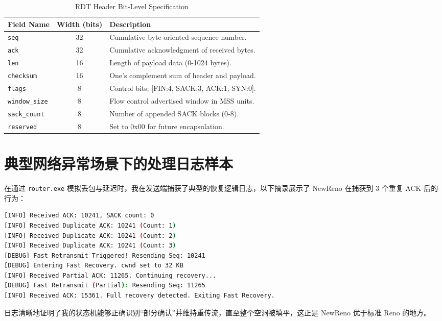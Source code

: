 \documentclass[UTF8,a4paper,10pt]{ctexart}
\begin{document}
\begin{table}[H]
    \centering
    \caption{RDT Header Bit-Level Specification}
    \label{tab:protocol_bits}
    \begin{tabular}{l|c|l}
        \toprule
        \textbf{Field Name}   & \textbf{Width (bits)} & \textbf{Description}                         \\
        \midrule
        \texttt{seq}          & 32                    & Cumulative byte-oriented sequence number.    \\
        \texttt{ack}          & 32                    & Cumulative acknowledgment of received bytes. \\
        \texttt{len}          & 16                    & Length of payload data (0-1024 bytes).       \\
        \texttt{checksum}     & 16                    & One's complement sum of header and payload.  \\
        \texttt{flags}        & 8                     & Control bits: [FIN:4, SACK:3, ACK:1, SYN:0]. \\
        \texttt{window\_size} & 8                     & Flow control advertised window in MSS units. \\
        \texttt{sack\_count}  & 8                     & Number of appended SACK blocks (0-8).        \\
        \texttt{reserved}     & 8                     & Set to 0x00 for future encapsulation.        \\
        \bottomrule
    \end{tabular}
\end{table}

\section{典型网络异常场景下的处理日志样本}

在通过 \texttt{router.exe} 模拟丢包与延迟时，我在发送端捕获了典型的恢复逻辑日志，以下摘录展示了 NewReno 在捕获到 3 个重复 ACK 后的行为：

\begin{lstlisting}[language=bash]
[INFO] Received ACK: 10241, SACK count: 0
[INFO] Received Duplicate ACK: 10241 (Count: 1)
[INFO] Received Duplicate ACK: 10241 (Count: 2)
[INFO] Received Duplicate ACK: 10241 (Count: 3)
[DEBUG] Fast Retransmit Triggered! Resending Seq: 10241
[DEBUG] Entering Fast Recovery. cwnd set to 32 KB
[INFO] Received Partial ACK: 11265. Continuing recovery...
[DEBUG] Fast Retransmit (Partial): Resending Seq: 11265
[INFO] Received ACK: 15361. Full recovery detected. Exiting Fast Recovery.
\end{lstlisting}

日志清晰地证明了我的状态机能够正确识别“部分确认”并维持重传流，直至整个空洞被填平，这正是 NewReno 优于标准 Reno 的地方。
\end{document}
